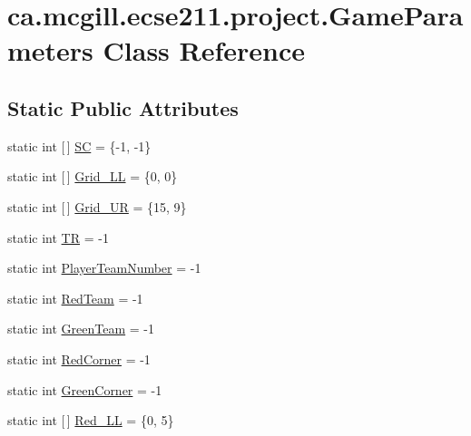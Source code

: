 \hypertarget{classca_1_1mcgill_1_1ecse211_1_1project_1_1_game_parameters}{}\section{ca.\+mcgill.\+ecse211.\+project.\+Game\+Parameters Class Reference}
\label{classca_1_1mcgill_1_1ecse211_1_1project_1_1_game_parameters}
\subsection*{Static Public Attributes}
\begin{DoxyCompactItemize}
\item 
static int \mbox{[}$\,$\mbox{]} \hyperlink{classca_1_1mcgill_1_1ecse211_1_1project_1_1_game_parameters_aae8c69151bc01acce692b9119323bb46}{SC} = \{-\/1, -\/1\}
\item 
static int \mbox{[}$\,$\mbox{]} \hyperlink{classca_1_1mcgill_1_1ecse211_1_1project_1_1_game_parameters_aec739d9ebcbd75db6a77ec288ff974cf}{Grid\+\_\+\+LL} = \{0, 0\}
\item 
static int \mbox{[}$\,$\mbox{]} \hyperlink{classca_1_1mcgill_1_1ecse211_1_1project_1_1_game_parameters_ab79c9c891076d29cbe5ac053f617c381}{Grid\+\_\+\+UR} = \{15, 9\}
\item 
static int \hyperlink{classca_1_1mcgill_1_1ecse211_1_1project_1_1_game_parameters_a5a299e93e098c89d12be1072947d3bcb}{TR} = -\/1
\item 
static int \hyperlink{classca_1_1mcgill_1_1ecse211_1_1project_1_1_game_parameters_a15bc3c24f73d1ad29b6fe7fd9e1ef0e6}{Player\+Team\+Number} = -\/1
\item 
static int \hyperlink{classca_1_1mcgill_1_1ecse211_1_1project_1_1_game_parameters_a51c899921677197f960f39e6ed42c780}{Red\+Team} = -\/1
\item 
static int \hyperlink{classca_1_1mcgill_1_1ecse211_1_1project_1_1_game_parameters_aca550f5067892ceeb8f44ede61bbc90e}{Green\+Team} = -\/1
\item 
static int \hyperlink{classca_1_1mcgill_1_1ecse211_1_1project_1_1_game_parameters_acf0dce5eb9dc754248f0c3de997d2809}{Red\+Corner} = -\/1
\item 
static int \hyperlink{classca_1_1mcgill_1_1ecse211_1_1project_1_1_game_parameters_a7fe7f10f96800fbd5f2331e3aa608b66}{Green\+Corner} = -\/1
\item 
static int \mbox{[}$\,$\mbox{]} \hyperlink{classca_1_1mcgill_1_1ecse211_1_1project_1_1_game_parameters_ae3eb3c87467d3a7760cd619a96379a9e}{Red\+\_\+\+LL} = \{0, 5\}

\end{DoxyCompactItemize}
